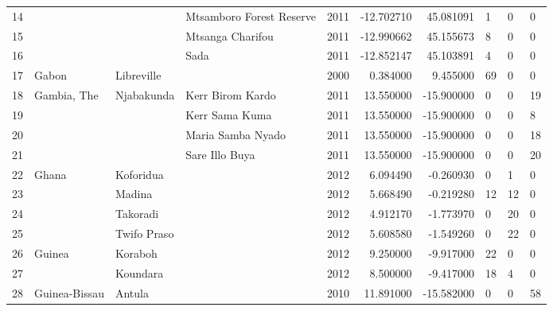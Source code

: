 \begin{tabular}{llllrrrlll}
14 &                    &                 &  Mtsamboro Forest Reserve &  2011 & -12.702710 &  45.081091 &       1 &        0 &       0 \\
15 &                    &                 &          Mtsanga Charifou &  2011 & -12.990662 &  45.155673 &       8 &        0 &       0 \\
16 &                    &                 &                      Sada &  2011 & -12.852147 &  45.103891 &       4 &        0 &       0 \\
17 &              Gabon &      Libreville &                           &  2000 &   0.384000 &   9.455000 &      69 &        0 &       0 \\
18 &        Gambia, The &      Njabakunda &          Kerr Birom Kardo &  2011 &  13.550000 & -15.900000 &       0 &        0 &      19 \\
19 &                    &                 &            Kerr Sama Kuma &  2011 &  13.550000 & -15.900000 &       0 &        0 &       8 \\
20 &                    &                 &         Maria Samba Nyado &  2011 &  13.550000 & -15.900000 &       0 &        0 &      18 \\
21 &                    &                 &            Sare Illo Buya &  2011 &  13.550000 & -15.900000 &       0 &        0 &      20 \\
22 &              Ghana &       Koforidua &                           &  2012 &   6.094490 &  -0.260930 &       0 &        1 &       0 \\
23 &                    &          Madina &                           &  2012 &   5.668490 &  -0.219280 &      12 &       12 &       0 \\
24 &                    &        Takoradi &                           &  2012 &   4.912170 &  -1.773970 &       0 &       20 &       0 \\
25 &                    &     Twifo Praso &                           &  2012 &   5.608580 &  -1.549260 &       0 &       22 &       0 \\
26 &             Guinea &         Koraboh &                           &  2012 &   9.250000 &  -9.917000 &      22 &        0 &       0 \\
27 &                    &        Koundara &                           &  2012 &   8.500000 &  -9.417000 &      18 &        4 &       0 \\
28 &      Guinea-Bissau &          Antula &                           &  2010 &  11.891000 & -15.582000 &       0 &        0 &      58 \\

\end{tabular}

